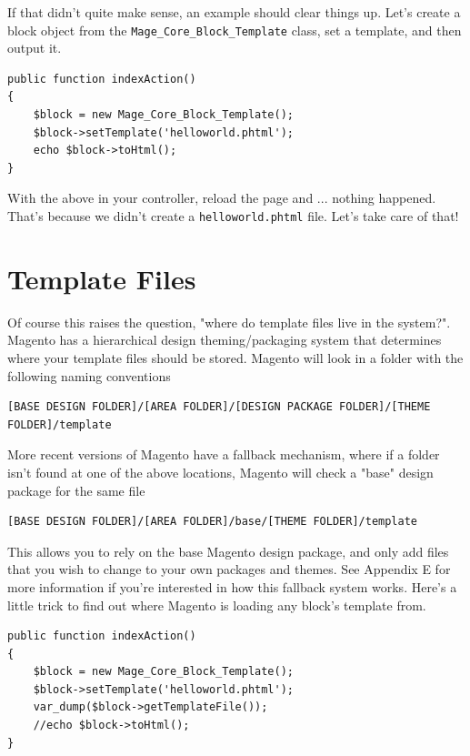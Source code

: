 \documentclass[oneside]{book}
\begin{document}
If that didn't quite make sense, an example should clear things up.  Let's create a block object from the \footnotesize\texttt{Mage\_Core\_Block\_Template} \normalsize  class, set a template, and then output it.

\begin{lstlisting}
public function indexAction()
{
    $block = new Mage_Core_Block_Template();
    $block->setTemplate('helloworld.phtml');
    echo $block->toHtml();
}

\end{lstlisting}


With the above in your controller, reload the page and ... nothing happened.  That's because we didn't create a \footnotesize\texttt{helloworld.phtml} \normalsize  file.  Let's take care of that!

\section{Template Files}

Of course this raises the question, "where do template files live in the system?".  Magento has a hierarchical design theming/packaging system that determines where your template files should be stored.  Magento will look in a folder with the following naming conventions

\begin{lstlisting}
[BASE DESIGN FOLDER]/[AREA FOLDER]/[DESIGN PACKAGE FOLDER]/[THEME FOLDER]/template

\end{lstlisting}


More recent versions of Magento have a fallback mechanism, where if a folder isn't found at one of the above locations, Magento will check a "base" design package for the same file

\begin{lstlisting}
[BASE DESIGN FOLDER]/[AREA FOLDER]/base/[THEME FOLDER]/template

\end{lstlisting}


This allows you to rely on the base Magento design package, and only add files that you wish to change to your own packages and themes.  See Appendix E for more information if you're interested in how this fallback system works.  Here's a little trick to find out where Magento is loading any block's template from.

\begin{lstlisting}
public function indexAction()
{
    $block = new Mage_Core_Block_Template();
    $block->setTemplate('helloworld.phtml');
    var_dump($block->getTemplateFile());
    //echo $block->toHtml();
}

\end{lstlisting}
\end{document}
